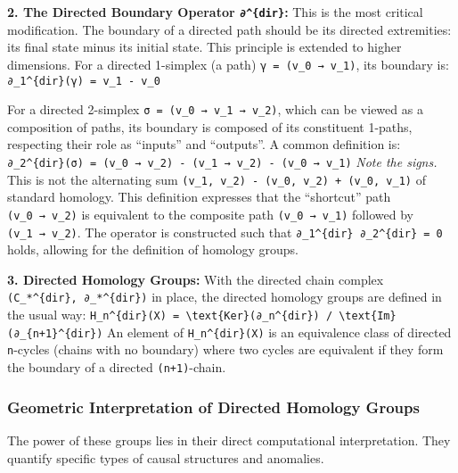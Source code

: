 \documentclass[
]{article}
\begin{document}
\textbf{2. The Directed Boundary Operator \texttt{∂\^{}\{dir\}}:} This
is the most critical modification. The boundary of a directed path
should be its directed extremities: its final state minus its initial
state. This principle is extended to higher dimensions. For a directed
1-simplex (a path) \texttt{γ\ =\ (v\_0\ →\ v\_1)}, its boundary is:
\texttt{∂\_1\^{}\{dir\}(γ)\ =\ v\_1\ -\ v\_0}

For a directed 2-simplex \texttt{σ\ =\ (v\_0\ →\ v\_1\ →\ v\_2)}, which
can be viewed as a composition of paths, its boundary is composed of its
constituent 1-paths, respecting their role as ``inputs'' and
``outputs''. A common definition is:
\texttt{∂\_2\^{}\{dir\}(σ)\ =\ (v\_0\ →\ v\_2)\ -\ (v\_1\ →\ v\_2)\ -\ (v\_0\ →\ v\_1)}
\emph{Note the signs.} This is not the alternating sum
\texttt{(v\_1,\ v\_2)\ -\ (v\_0,\ v\_2)\ +\ (v\_0,\ v\_1)} of standard
homology. This definition expresses that the ``shortcut'' path
\texttt{(v\_0\ →\ v\_2)} is equivalent to the composite path
\texttt{(v\_0\ →\ v\_1)} followed by \texttt{(v\_1\ →\ v\_2)}. The
operator is constructed such that
\texttt{∂\_1\^{}\{dir\}\ ∂\_2\^{}\{dir\}\ =\ 0} holds, allowing for the
definition of homology groups.

\textbf{3. Directed Homology Groups:} With the directed chain complex
\texttt{(C\_*\^{}\{dir\},\ ∂\_*\^{}\{dir\})} in place, the directed
homology groups are defined in the usual way:
\texttt{H\_n\^{}\{dir\}(X)\ =\ \textbackslash{}text\{Ker\}(∂\_n\^{}\{dir\})\ /\ \textbackslash{}text\{Im\}(∂\_\{n+1\}\^{}\{dir\})}
An element of \texttt{H\_n\^{}\{dir\}(X)} is an equivalence class of
directed \texttt{n}-cycles (chains with no boundary) where two cycles
are equivalent if they form the boundary of a directed
\texttt{(n+1)}-chain.

\subsubsection{Geometric Interpretation of Directed Homology
Groups}\label{geometric-interpretation-of-directed-homology-groups}

The power of these groups lies in their direct computational
interpretation. They quantify specific types of causal structures and
anomalies.
\end{document}
